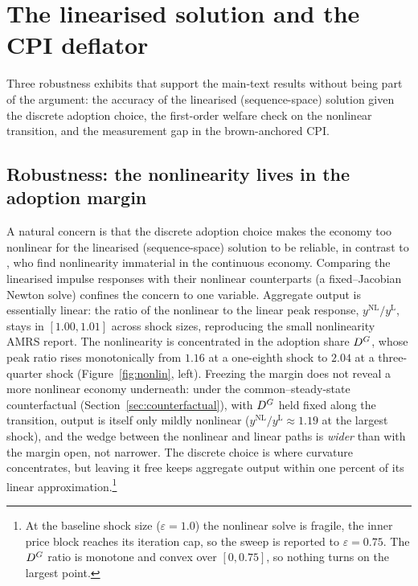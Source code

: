 \section{The linearised solution and the CPI deflator}\label{app:deflator}
\label{app:nonlin}

Three robustness exhibits that support the main-text results without being part
of the argument: the accuracy of the linearised (sequence-space) solution given
the discrete adoption choice, the first-order welfare check on the nonlinear
transition, and the measurement gap in the brown-anchored CPI.

\subsection{Robustness: the nonlinearity lives in the adoption margin}
\label{sec:nonlin}

A natural concern is that the discrete adoption choice makes the economy too
nonlinear for the linearised (sequence-space) solution to be reliable, in
contrast to \citet{ARS2024}, who find nonlinearity immaterial in the continuous
economy. Comparing the linearised impulse responses with their nonlinear
counterparts (a fixed--Jacobian Newton solve) confines the concern to one
variable. Aggregate output is essentially linear: the ratio of the nonlinear to
the linear peak response, $y^{\mathrm{NL}}/y^{\mathrm{L}}$, stays in $[1.00,1.01]$
across shock sizes, reproducing the small nonlinearity AMRS report. The
nonlinearity is concentrated in the adoption share $D^{G}$, whose peak ratio rises
monotonically from $1.16$ at a one-eighth shock to $2.04$ at a three-quarter
shock (Figure~\ref{fig:nonlin}, left). Freezing the margin does not reveal a more
nonlinear economy underneath: under the common--steady-state counterfactual
(Section~\ref{sec:counterfactual}), with $D^{G}$ held fixed along the transition,
output is itself only mildly nonlinear ($y^{\mathrm{NL}}/y^{\mathrm{L}}\approx
1.19$ at the largest shock), and the wedge between the nonlinear and linear paths
is \emph{wider} than with the margin open, not narrower. The discrete choice is
where curvature concentrates, but leaving it free keeps aggregate output within
one percent of its linear approximation.\footnote{At the baseline shock size
($\varepsilon=1.0$) the nonlinear solve is fragile, the inner price block reaches
its iteration cap, so the sweep is reported to $\varepsilon=0.75$. The $D^{G}$
ratio is monotone and convex over $[0,0.75]$, so nothing turns on the largest
point.}


